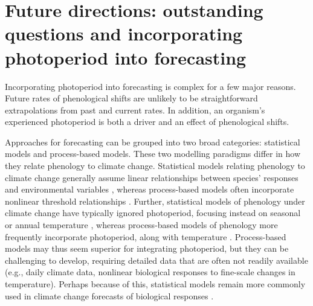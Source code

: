 \documentclass{article}
\begin{document}
\section*{Future directions: outstanding questions and incorporating photoperiod into forecasting}
\par Incorporating photoperiod into forecasting is complex for a few major reasons. Future rates of phenological shifts are unlikely to be straightforward extrapolations from past and current rates. In addition, an organism's experienced photoperiod is both a driver and an effect of phenological shifts. 

\par Approaches for forecasting can be grouped into two broad categories: statistical models and process-based models. These two modelling paradigms differ in how they relate phenology to climate change. Statistical models relating phenology to climate change generally assume linear relationships between species' responses and environmental variables \citep[e.g., ][]{flynn2018,van2007,ibanez2010}, whereas process-based models often incorporate nonlinear threshold relationships \citep[e.g.][]{chuine2001,morin2009,xie1989}. Further, statistical models of phenology under climate change have typically ignored photoperiod, focusing instead on seasonal or annual temperature \citep[e.g.][but see \citet{richardson2013}]{diez2012,ibanez2010,van2007}, whereas process-based models of phenology more frequently incorporate photoperiod, along with temperature \citep{lundell2020,duputie2015,zhao2013,morin2009,xie1989}. Process-based models may thus seem superior for integrating photoperiod, but they can be challenging to develop, requiring detailed data that are often not readily available (e.g., daily climate data, nonlinear biological responses to fine-scale changes in temperature). Perhaps because of this, statistical models remain more commonly used in climate change forecasts of biological responses \citep[e.g.,][]{garcia2016,Basler:2012,diez2012,zhu2012,ibanez2010,van2007}.
\end{document}
